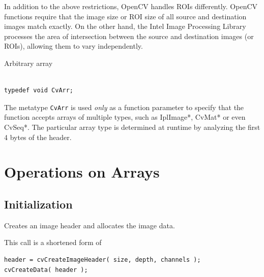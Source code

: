 In addition to the above restrictions, OpenCV handles ROIs differently. OpenCV functions require that the image size or ROI size of all source and destination images match exactly. On the other hand, the Intel Image Processing Library processes the area of intersection between the source and destination images (or ROIs), allowing them to vary independently. 

\label{CvArr}

Arbitrary array

\begin{lstlisting}

typedef void CvArr;

\end{lstlisting}

The metatype \texttt{CvArr} is used \textit{only} as a function parameter to specify that the function accepts arrays of multiple types, such as IplImage*, CvMat* or even CvSeq*. The particular array type is determined at runtime by analyzing the first 4 bytes of the header.


\section{Operations on Arrays}

\subsection{Initialization}

\label{CreateImage}

Creates an image header and allocates the image data.


\begin{description}
\end{description}

This call is a shortened form of

\begin{lstlisting}
header = cvCreateImageHeader( size, depth, channels );
cvCreateData( header );
\end{lstlisting}


